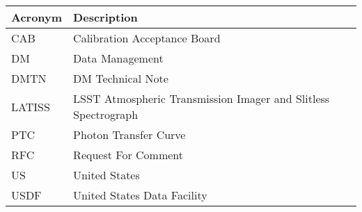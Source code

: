 \addtocounter{table}{-1}
\begin{longtable}{p{}p{}}\hline
\textbf{Acronym} & \textbf{Description}  \\\hline

CAB & Calibration Acceptance Board \\\hline
DM & Data Management \\\hline
DMTN & DM Technical Note \\\hline
LATISS & LSST Atmospheric Transmission Imager and Slitless Spectrograph \\\hline
PTC & Photon Transfer Curve \\\hline
RFC & Request For Comment \\\hline
US & United States \\\hline
USDF & United States Data Facility \\\hline
\end{longtable}
